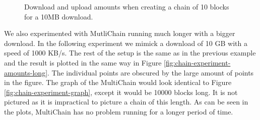 \begin{figure}
\centering
{}
\caption{Download and upload amounts when creating a chain of 10 blocks for a 10MB download.}
\label{fig:chain-experiment-amounts-small}
\end{figure}

We also experimented with MutliChain running much longer with a bigger download.
In the following experiment we mimick a download of 10 GB with a speed of 1000 KB/s.
The rest of the setup is the same as in the previous example
and the result is plotted in the same way in Figure \ref{fig:chain-experiment-amounts-long}.
The individual points are obscured by the large amount of points in the figure.
The graph of the MultiChain would look identical to Figure \ref{fig:chain-experiment-graph},
except it would be 10000 blocks long.
It is not pictured as it is impractical to picture a chain of this length.
As can be seen in the plots, MultiChain has no problem running for a longer period of time.

